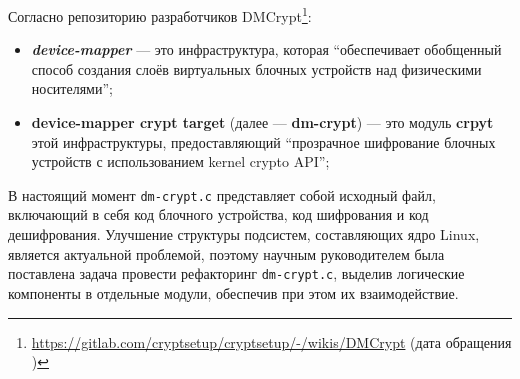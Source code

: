 Согласно репозиторию разработчиков DMCrypt\footnote{\href{https://gitlab.com/cryptsetup/cryptsetup/-/wikis/DMCrypt}{https://gitlab.com/cryptsetup/cryptsetup/-/wikis/DMCrypt} (дата обращения )}:
\begin{itemize}
    \item \textbf{\textit{device-mapper}} --- это инфраструктура, которая \enquote{обеспечивает обобщенный способ создания слоёв виртуальных блочных устройств над физическими носителями};
    \item \textbf{device-mapper crypt target} (далее --- \textbf{dm-crypt}) --- это модуль \textbf{crpyt} этой инфраструктуры, предоставляющий \enquote{прозрачное шифрование блочных устройств с использованием kernel crypto API};
\end{itemize}
В настоящий момент \texttt{dm-crypt.c} представляет собой исходный файл, включающий в себя код блочного устройства, код шифрования и код дешифрования.
Улучшение структуры подсистем, составляющих ядро Linux, является актуальной проблемой, поэтому научным руководителем была поставлена задача провести рефакторинг \texttt{dm-crypt.c}, выделив логические компоненты в отдельные модули, обеспечив при этом их взаимодействие.
